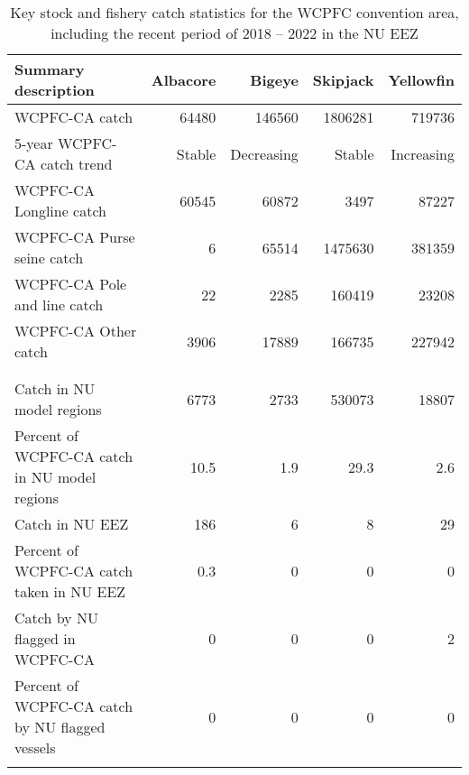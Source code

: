 \begin{longtable}{lrrrr}
\caption{Key stock and fishery catch statistics for the WCPFC convention area, including the recent period of 2018 -- 2022 in the NU EEZ} \\ 
  \hline
Summary description & Albacore & Bigeye & Skipjack & Yellowfin \\ 
  \hline
WCPFC-CA catch & 64480 & 146560 & 1806281 & 719736 \\ 
  5-year WCPFC-CA catch trend & Stable & Decreasing & Stable & Increasing \\ 
  WCPFC-CA Longline catch & 60545 & 60872 & 3497 & 87227 \\ 
  WCPFC-CA Purse seine catch & 6 & 65514 & 1475630 & 381359 \\ 
  WCPFC-CA Pole and line catch & 22 & 2285 & 160419 & 23208 \\ 
  WCPFC-CA Other catch & 3906 & 17889 & 166735 & 227942 \\ 
   &  &  &  &  \\ 
   \hline
 &  &  &  &  \\ 
  Catch in NU model regions & 6773 & 2733 & 530073 & 18807 \\ 
  Percent of WCPFC-CA catch in NU model regions & 10.5 & 1.9 & 29.3 & 2.6 \\ 
  Catch in NU EEZ & 186 & 6 & 8 & 29 \\ 
  Percent of WCPFC-CA catch taken in NU EEZ & 0.3 & 0 & 0 & 0 \\ 
  Catch by NU flagged in WCPFC-CA & 0 & 0 & 0 & 2 \\ 
  Percent of WCPFC-CA catch by NU flagged vessels & 0 & 0 & 0 & 0 \\ 
  \hline
\label{cat_sum_tab}
\end{longtable}
